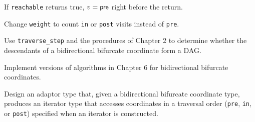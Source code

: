 \begin{lemma}
	If \verb|reachable| returns true, $v = \mathsf{pre}$ right before the return.
\end{lemma}

\begin{exercise}
	Change \verb|weight| to count \verb|in| or \verb|post| visits instead of \verb|pre|.
\end{exercise}



\begin{exercise}
	Use \verb|traverse_step| and the procedures of Chapter 2 to determine whether the
	descendants of a bidirectional bifurcate coordinate form a DAG.
\end{exercise}



\begin{project}
	Implement versions of algorithms in Chapter 6 for bidirectional bifurcate coordinates.
\end{project}

\begin{project}
	Design an adaptor type that, given a bidirectional bifurcate coordinate type, produces an iterator type
	that accesses coordinates in a traversal order (\verb|pre|, \verb|in|, or \verb|post|) specified when an
	iterator is constructed.
\end{project}
